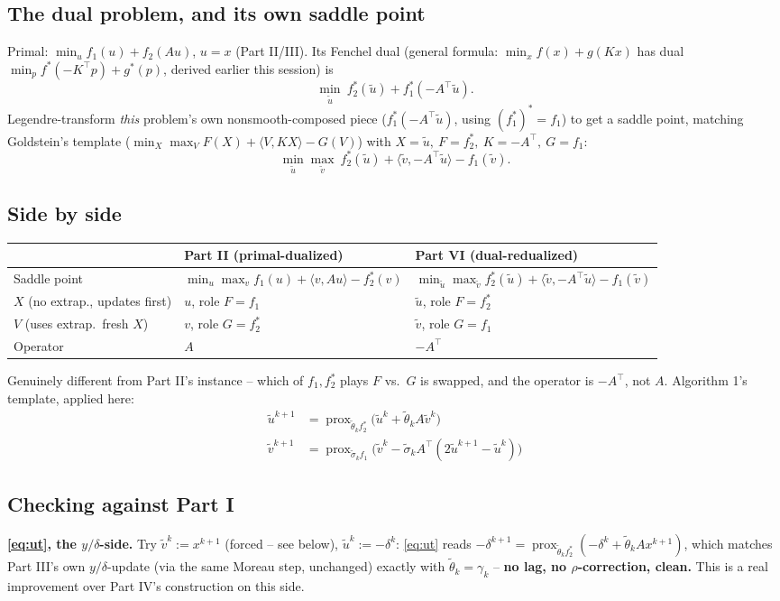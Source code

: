 \documentclass[11pt]{article}
\newcommand{\prox}{\operatorname{prox}}
\begin{document}
\subsection*{The dual problem, and its own saddle point}
Primal: $\min_u f_1(u)+f_2(Au)$, $u=x$ (Part II/III). Its Fenchel dual (general
formula: $\min_x f(x)+g(Kx)$ has dual $\min_p f^*(-K^\top p)+g^*(p)$, derived earlier
this session) is
\[
\min_{\tilde u}\ f_2^*(\tilde u) + f_1^*(-A^\top\tilde u).
\]
Legendre-transform \emph{this} problem's own nonsmooth-composed piece
($f_1^*(-A^\top\tilde u)$, using $(f_1^*)^*=f_1$) to get a saddle point, matching
Goldstein's template ($\min_X\max_V F(X)+\langle V,KX\rangle-G(V)$) with
$X=\tilde u,\ F=f_2^*,\ K=-A^\top,\ G=f_1$:
\[
\min_{\tilde u}\max_{\tilde v}\ f_2^*(\tilde u) + \langle\tilde v,-A^\top\tilde u\rangle - f_1(\tilde v).
\]

\subsection*{Side by side}
\begin{center}
\begin{tabular}{@{}lll@{}}
\toprule
& Part II (primal-dualized) & Part VI (dual-redualized)\\
\midrule
Saddle point & $\min_u\max_v f_1(u)+\langle v,Au\rangle-f_2^*(v)$ & $\min_{\tilde u}\max_{\tilde v} f_2^*(\tilde u)+\langle\tilde v,-A^\top\tilde u\rangle-f_1(\tilde v)$\\
$X$ (no extrap., updates first) & $u$, role $F=f_1$ & $\tilde u$, role $F=f_2^*$\\
$V$ (uses extrap.\ fresh $X$) & $v$, role $G=f_2^*$ & $\tilde v$, role $G=f_1$\\
Operator & $A$ & $-A^\top$\\
\bottomrule
\end{tabular}
\end{center}
Genuinely different from Part II's instance -- which of $f_1,f_2^*$ plays $F$ vs.\ $G$
is swapped, and the operator is $-A^\top$, not $A$. Algorithm 1's template, applied here:
\begin{align}
\tilde u^{k+1} &= \prox_{\tilde\theta_k f_2^*}\big(\tilde u^k+\tilde\theta_kA\tilde v^k\big) \label{eq:ut}\\
\tilde v^{k+1} &= \prox_{\tilde\sigma_k f_1}\big(\tilde v^k-\tilde\sigma_kA^\top(2\tilde u^{k+1}-\tilde u^k)\big) \label{eq:vt}
\end{align}

\subsection*{Checking against Part I}
\textbf{\eqref{eq:ut}, the $y/\delta$-side.} Try $\tilde v^k:=x^{k+1}$ (forced -- see
below), $\tilde u^k:=-\delta^k$: \eqref{eq:ut} reads
$-\delta^{k+1}=\prox_{\tilde\theta_kf_2^*}(-\delta^k+\tilde\theta_kAx^{k+1})$, which
matches Part III's own $y/\delta$-update (via the same Moreau step, unchanged) exactly
with $\tilde\theta_k=\gamma_k$ -- \textbf{no lag, no $\rho$-correction, clean.} This is
a real improvement over Part IV's construction on this side.
\end{document}
